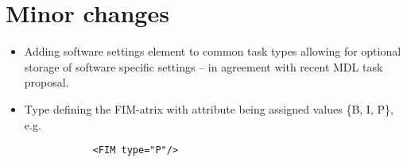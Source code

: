 \section{Minor changes}

\begin{itemize}
\item 
Adding software settings element  to common task 
types allowing for optional storage of software specific settings -- in agreement 
with recent MDL task proposal.
\item
Type defining the FIM-atrix with attribute  being assigned values \{B, I, P\}, e.g.
\lstset{language=XML}
\begin{lstlisting}
			<FIM type="P"/>
\end{lstlisting}
\end{itemize}


